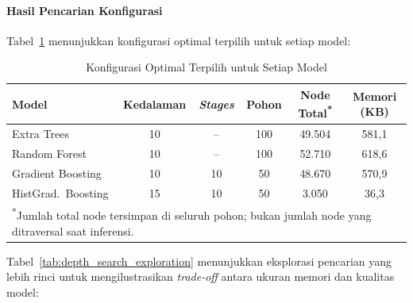 \paragraph{Hasil Pencarian Konfigurasi}
Tabel~\ref{tab:depth_search_results} menunjukkan konfigurasi optimal terpilih untuk setiap model:

\begin{table}[htbp]
\centering
\caption{Konfigurasi Optimal Terpilih untuk Setiap Model}
\label{tab:depth_search_results}
\begin{tabular}{lccccc}
\hline
\textbf{Model} & \textbf{Kedalaman} & \textbf{\textit{Stages}} & \textbf{Pohon} & \textbf{Node Total\textsuperscript{*}} & \textbf{Memori (KB)} \\
\hline
Extra Trees & 10 & -- & 100 & 49.504 & 581,1 \\
Random Forest & 10 & -- & 100 & 52.710 & 618,6 \\
Gradient Boosting & 10 & 10 & 50 & 48.670 & 570,9 \\
HistGrad.\ Boosting & 15 & 10 & 50 & 3.050 & 36,3 \\
\hline
\multicolumn{6}{l}{\footnotesize \textsuperscript{*}Jumlah total node tersimpan di seluruh pohon; bukan jumlah node yang ditraversal saat inferensi.}
\end{tabular}
\end{table}

Tabel~\ref{tab:depth_search_exploration} menunjukkan eksplorasi pencarian yang lebih rinci untuk mengilustrasikan \textit{trade-off} antara ukuran memori dan kualitas model:

